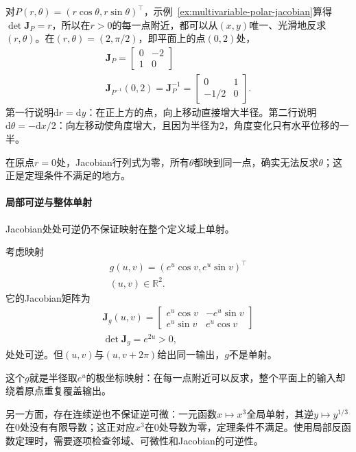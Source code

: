 \begin{example}[极坐标的局部反函数]
\label{ex:multivariable-polar-local-inverse}
对$P(r,\theta)=(r\cos\theta,r\sin\theta)^\top$，示例~\ref{ex:multivariable-polar-jacobian}算得$\det\bm J_P=r$，所以在$r>0$的每一点附近，都可以从$(x,y)$唯一、光滑地反求$(r,\theta)$。在$(r,\theta)=(2,\pi/2)$，即平面上的点$(0,2)$处，
\[
\begin{gathered}
\bm J_P=\begin{bmatrix}0&-2\\1&0\end{bmatrix}\\
\bm J_{P^{-1}}(0,2)=\bm J_P^{-1}=\begin{bmatrix}0&1\\-1/2&0\end{bmatrix}.
\end{gathered}
\]
第一行说明$\mathrm dr=\mathrm dy$：在正上方的点，向上移动直接增大半径。第二行说明$\mathrm d\theta=-\mathrm dx/2$：向左移动使角度增大，且因为半径为$2$，角度变化只有水平位移的一半。
\end{example}

在原点$r=0$处，Jacobian行列式为零，所有$\theta$都映到同一点，确实无法反求$\theta$；这正是定理条件不满足的地方。

\paragraph{局部可逆与整体单射}

Jacobian处处可逆仍不保证映射在整个定义域上单射。
\begin{example}[Jacobian处处可逆而不单射]
\label{ex:multivariable-local-not-global-inverse}
考虑映射
\[
\begin{gathered}
g(u,v)=(e^u\cos v,e^u\sin v)^\top\\
(u,v)\in\mathbb R^2.
\end{gathered}
\]
它的Jacobian矩阵为
\[
\begin{gathered}
\bm J_g(u,v)=\begin{bmatrix}e^u\cos v&-e^u\sin v\\ e^u\sin v&e^u\cos v\end{bmatrix}\\
\det\bm J_g=e^{2u}>0,
\end{gathered}
\]
处处可逆。但$(u,v)$与$(u,v+2\pi)$给出同一输出，$g$不是单射。
\end{example}

这个$g$就是半径取$e^u$的极坐标映射：在每一点附近可以反求，整个平面上的输入却绕着原点重复覆盖输出。

另一方面，存在连续逆也不保证逆可微：一元函数$x\mapsto x^3$全局单射，其逆$y\mapsto y^{1/3}$在$0$处没有有限导数；这正对应$x^3$在$0$处导数为零，定理条件不满足。使用局部反函数定理时，需要逐项检查邻域、可微性和Jacobian的可逆性。

\FloatBarrier
